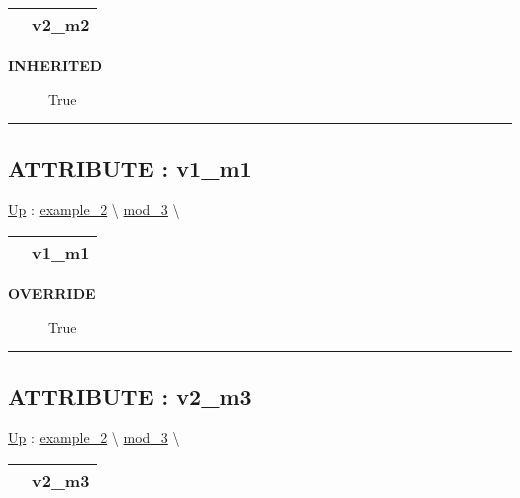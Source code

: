 {\renewcommand{\arraystretch}{1.5}
\begin{tabularx}{\textwidth}{|>{\raggedright\arraybackslash}l|X|}
\hline
\hspace{0pt} & v2\_m2 \\
\hline
\end{tabularx}
}

\par

\par
\begin{description}
\item [\textbf{INHERITED}] True
\end{description}

\rule{\linewidth}{0.5pt}
\subsection*{ATTRIBUTE : v1\_m1}
\hypertarget{ecldoc:example_2.mod_3.v1_m1}{}
\hyperlink{ecldoc:example_2.mod_3}{Up} :
\hspace{0pt} \hyperlink{ecldoc:example_2}{example_2} \textbackslash 
\hspace{0pt} \hyperlink{ecldoc:example_2.mod_3}{mod_3} \textbackslash 

{\renewcommand{\arraystretch}{1.5}
\begin{tabularx}{\textwidth}{|>{\raggedright\arraybackslash}l|X|}
\hline
\hspace{0pt} & v1\_m1 \\
\hline
\end{tabularx}
}

\par

\par
\begin{description}
\item [\textbf{OVERRIDE}] True
\end{description}

\rule{\linewidth}{0.5pt}
\subsection*{ATTRIBUTE : v2\_m3}
\hypertarget{ecldoc:example_2.mod_3.v2_m3}{}
\hyperlink{ecldoc:example_2.mod_3}{Up} :
\hspace{0pt} \hyperlink{ecldoc:example_2}{example_2} \textbackslash 
\hspace{0pt} \hyperlink{ecldoc:example_2.mod_3}{mod_3} \textbackslash 

{\renewcommand{\arraystretch}{1.5}
\begin{tabularx}{\textwidth}{|>{\raggedright\arraybackslash}l|X|}
\hline
\hspace{0pt} & v2\_m3 \\
\hline
\end{tabularx}
}

